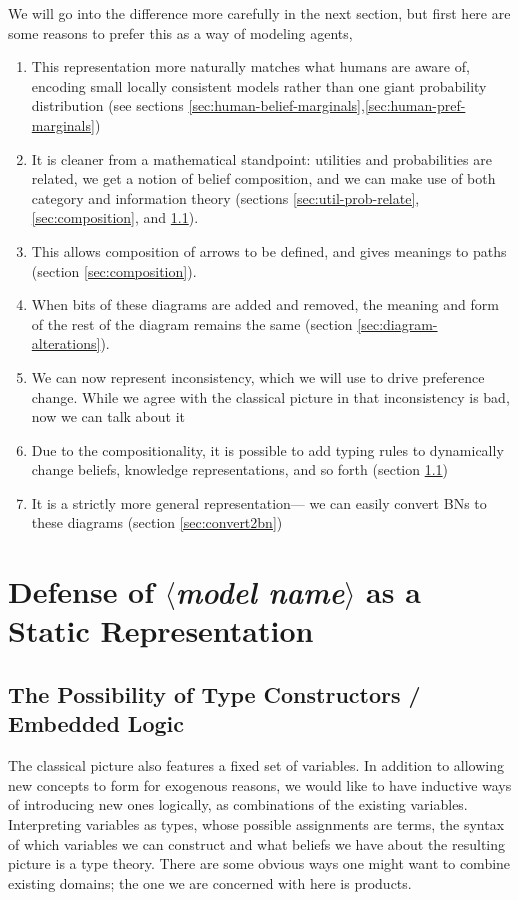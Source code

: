 \documentclass{article}
\newcommand\modelname{{\color{blue!50!black}$\langle$\itshape model name$\rangle$ }}
\begin{document}
	We will go into the difference more carefully in the next section, but first here are some reasons to prefer this as a way of modeling agents,%
	
	\begin{enumerate}[nosep]
		\item This representation more naturally matches what humans are aware of, encoding small locally consistent models rather than one giant probability distribution (see sections \ref{sec:human-belief-marginals},\ref{sec:human-pref-marginals})
		\item It is cleaner from a mathematical standpoint: utilities and probabilities are related, we get a notion of belief composition, and we can make use of both category and information theory (sections \ref{sec:util-prob-relate}, \ref{sec:composition}, and \ref{sec:belief-typing}).
		\item This allows composition of arrows to be defined, and gives meanings to paths (section \ref{sec:composition}).
		\item When bits of these diagrams are added and removed, the meaning and form of the rest of the diagram remains the same (section \ref{sec:diagram-alterations}).
		\item We can now represent inconsistency, which we will use to drive preference change. While we agree with the classical picture in that inconsistency is bad, now we can talk about it
		\item Due to the compositionality, it is possible to add typing rules to dynamically change beliefs, knowledge representations, and so forth (section \ref{sec:belief-typing})
		\item It is a strictly more general representation--- we can easily convert BNs to these diagrams (section \ref{sec:convert2bn})
	\end{enumerate}

	
	
	
	\section{Defense of \modelname as a Static Representation }
	\subsection{The Possibility of Type Constructors / Embedded Logic}\label{sec:belief-typing}
	The classical picture also features a fixed set of variables. In addition to allowing new concepts to form for exogenous reasons, we would like to have inductive ways of introducing new ones logically, as combinations of the existing variables. Interpreting variables as types, whose possible assignments are terms, the syntax of which variables we can construct and what beliefs we have about the resulting picture is a type theory. There are some obvious ways one might want to combine existing domains; the one we are concerned with here is products.
	
\end{document}
